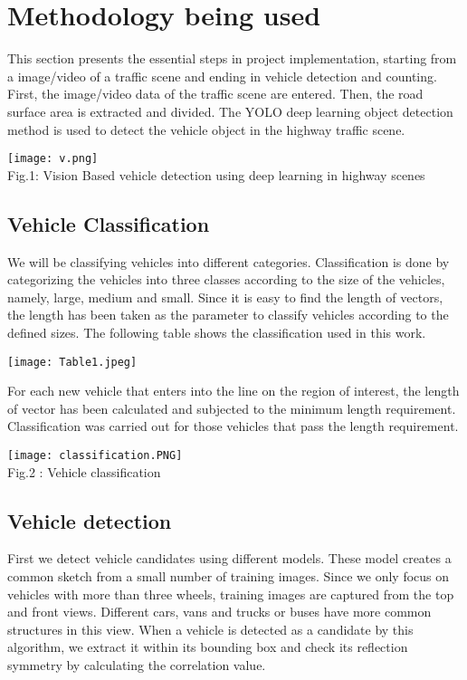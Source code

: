 \documentclass[12pt,a4paper,roman]{article}
\begin{document}
\newpage
\section{Methodology being used}
This section presents the essential steps in project implementation, starting from a image/video of a traffic scene and ending in vehicle detection and counting. First, the image/video data of the traffic scene are entered. Then, the road surface area is extracted and divided. The YOLO deep learning object detection method is used to detect the vehicle object in the highway traffic scene.
\begin{center}
    \texttt{[image: v.png]} \\
    Fig.1:  Vision Based vehicle detection using deep learning in highway scenes
\end{center}


\subsection{Vehicle Classification}
We will be classifying vehicles into different categories. Classification is done by categorizing the vehicles into three classes according to the size of the vehicles, namely, large, medium and small. Since it is easy to find the length of vectors, the length has been taken as the parameter to classify vehicles according to the defined sizes. The following table shows the classification used in this work.

\begin{center}
    \texttt{[image: Table1.jpeg]}
\end{center}

For each new vehicle that enters into the line on the region of interest, the length of vector has been calculated and subjected to the minimum length requirement. Classification was carried out for those vehicles that pass the length requirement. 

\begin{center}
\texttt{[image: classification.PNG]}\\
 Fig.2 : Vehicle classification
\end{center}

\subsection{Vehicle detection}
First we detect vehicle candidates using different models. These model creates a common sketch from a small number of training images. Since we only focus on vehicles with more than three wheels, training images are captured from the top and front views. Different cars, vans and trucks or buses have more common structures in this view. When a vehicle is detected as a candidate by this algorithm, we extract it within its bounding box and check its reflection symmetry by calculating the correlation value.
\end{document}

